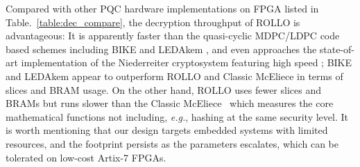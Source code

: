 \documentclass[submission]{iacrtrans}
\theoremstyle{plain}
\begin{document}
Compared with other PQC hardware implementations on FPGA listed in Table.~\ref{table:dec_compare}, the decryption throughput of ROLLO is advantageous: It is apparently faster than the quasi-cyclic MDPC/LDPC code based schemes including BIKE \cite{richter2020folding} and LEDAkem \cite{hu2019lightweight}, and even approaches the state-of-art implementation of the Niederreiter cryptosystem featuring high speed \cite{wang2018fpga}; BIKE and LEDAkem appear to outperform ROLLO and Classic McEliece in terms of slices and BRAM usage. On the other hand, ROLLO uses fewer slices and BRAMs but runs slower than the Classic McEliece~\cite{bernstein2020classic} which measures the core mathematical functions not including, \textit{e.g.}, hashing at the same security level. It is worth mentioning that our design targets embedded systems with limited resources, and the footprint persists as the parameters escalates, which can be tolerated on low-cost Artix-7 FPGAs.
\end{document}
